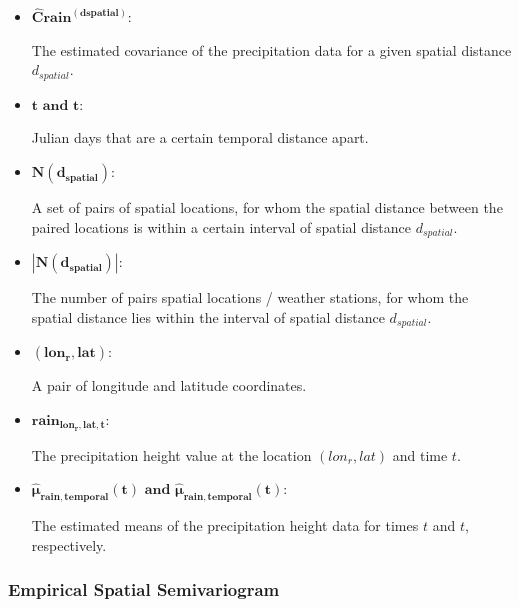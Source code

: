 \documentclass[
  12pt,
]{article}
\begin{document}
\begin{itemize}[label={}]
\item $\mathbf{\widehat{C}{rain}^{\left(d{spatial}\right)}}$:
\begin{adjustwidth}{1cm}{0cm}
The estimated covariance of the precipitation data for a given spatial distance $d_{spatial}$.
\end{adjustwidth}
\item $\mathbf{t\text{ and }t}$:
\begin{adjustwidth}{1cm}{0cm}
Julian days that are a certain temporal distance apart.
\end{adjustwidth}
\item $\mathbf{N(d_{spatial})}$:
\begin{adjustwidth}{1cm}{0cm}
A set of pairs of spatial locations, for whom the spatial distance between the paired locations is within a certain interval of spatial distance $d_{spatial}$.
\end{adjustwidth}
\item $\mathbf{|N(d_{spatial})|}$:
\begin{adjustwidth}{1cm}{0cm}
The number of pairs spatial locations / weather stations, for whom the spatial distance lies within the interval of spatial distance $d_{spatial}$.
\end{adjustwidth}
\item $\mathbf{(lon_r,lat)}$:
\begin{adjustwidth}{1cm}{0cm}
A pair of longitude and latitude coordinates.
\end{adjustwidth}
\item $\mathbf{rain_{lon_r,lat,t}}$:
\begin{adjustwidth}{1cm}{0cm}
The precipitation height value at the location $(lon_r,lat)$ and time $t$.
\end{adjustwidth}
\item $\mathbf{\widehat{\mu}_{rain,temporal}(t) \text{ and } \widehat{\mu}_{rain,temporal}(t)}$:
\begin{adjustwidth}{1cm}{0cm}
The estimated means of the precipitation height data for times $t$ and $t$, respectively.
\end{adjustwidth}
\end{itemize}

\clearpage

\hypertarget{empirical-spatial-semivariogram}{%
\subsubsection{Empirical Spatial
Semivariogram}\label{empirical-spatial-semivariogram}}
\end{document}
